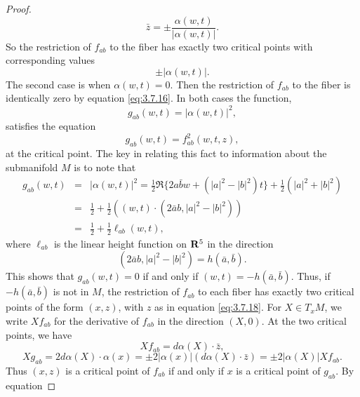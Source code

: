 \documentclass[12pt]{article}
\begin{document}
\begin{proof}
\begin{equation} 
\label{eq:3.7.18}
\bar{z} = \pm \frac{\alpha (w,t)}{|\alpha (w,t)|}.
\end{equation}
So the restriction of $f_{ab}$ to the fiber has exactly two critical points with corresponding values
\begin{equation} 
\label{eq:3.7.19}
\pm |\alpha (w,t)|.
\end{equation}
The second case is when $\alpha (w,t) = 0$.  Then the restriction of $f_{ab}$ to the fiber is identically zero
by equation \eqref{eq:3.7.16}.  In both cases the function,
\begin{displaymath}
g_{ab} (w,t) = |\alpha (w,t)|^2,
\end{displaymath}
satisfies the equation
\begin{displaymath}
g_{ab} (w,t) = f_{ab}^2 (w,t,z),
\end{displaymath}
at the critical point.  The key in relating this fact to information about the submanifold $M$ is to note that
\begin{eqnarray} 
\label{eq:3.7.20}
g_{ab} (w,t) & = & |\alpha (w,t)|^2 = \frac{1}{2} \Re \{2 a \bar{b} w + (|a|^2 - |b|^2)t\} + \frac{1}{2}(|a|^2 + |b|^2)
\nonumber \\
 & = & \frac{1}{2} + \frac{1}{2} ((w,t) \cdot (2 \bar{a} b, |a|^2 - |b|^2)) \\
& = & \frac{1}{2} + \frac{1}{2} \ell_{ab} (w,t), \nonumber
\end{eqnarray}
where $\ell_{ab}$ is the linear height function on ${\bf R}^5$ in the direction
\begin{displaymath}
(2\bar{a} b, |a|^2 - |b|^2) = h (\bar{a}, \bar{b}).
\end{displaymath}
This shows that $g_{ab} (w,t) = 0$ if and only if $(w,t) = - h(\bar{a}, \bar{b})$.  Thus, if $- h(\bar{a}, \bar{b})$
is not in $M$, the restriction of $f_{ab}$ to each fiber has exactly two critical points of the form $(x,z)$, with $z$
as in equation \eqref{eq:3.7.18}.  For $X \in T_x M$, we write $Xf_{ab}$ for the derivative of $f_{ab}$ in the direction
$(X,0)$.  At the two critical points, we have
\begin{equation} 
\label{eq:3.7.21}
Xf_{ab} = d\alpha (X) \cdot \bar{z},
\end{equation}
\begin{equation} 
\label{eq:3.7.22}
Xg_{ab} = 2 d\alpha (X) \cdot \alpha (x) = \pm 2|\alpha (x)| (d\alpha (X)\cdot \bar{z}) = \pm 2|\alpha (X)| Xf_{ab}.
\end{equation}
Thus $(x,z)$ is a critical point of $f_{ab}$ if and only if $x$ is a critical point of $g_{ab}$.  By equation

\end{proof}
\end{document}
